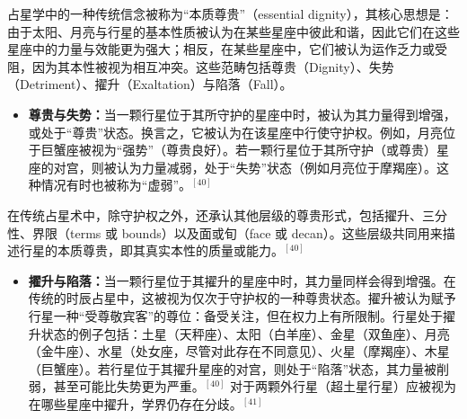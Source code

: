 占星学中的一种传统信念被称为“本质尊贵”（essential dignity），其核心思想是：由于太阳、月亮与行星的基本性质被认为在某些星座中彼此和谐，因此它们在这些星座中的力量与效能更为强大；相反，在某些星座中，它们被认为运作乏力或受阻，因为其本性被视为相互冲突。这些范畴包括尊贵（Dignity）、失势（Detriment）、擢升（Exaltation）与陷落（Fall）。
\begin{itemize}
\item \textbf{尊贵与失势：}当一颗行星位于其所守护的星座中时，被认为其力量得到增强，或处于“尊贵”状态。换言之，它被认为在该星座中行使守护权。例如，月亮位于巨蟹座被视为“强势”（尊贵良好）。若一颗行星位于其所守护（或尊贵）星座的对宫，则被认为力量减弱，处于“失势”状态（例如月亮位于摩羯座）。这种情况有时也被称为“虚弱”。$^{[40]}$  
\end{itemize}
在传统占星术中，除守护权之外，还承认其他层级的尊贵形式，包括擢升、三分性、界限（terms 或 bounds）以及面或旬（face 或 decan）。这些层级共同用来描述行星的本质尊贵，即其真实本性的质量或能力。$^{[40]}$
\begin{itemize}
\item \textbf{擢升与陷落：}当一颗行星位于其擢升的星座中时，其力量同样会得到增强。在传统的时辰占星中，这被视为仅次于守护权的一种尊贵状态。擢升被认为赋予行星一种“受尊敬宾客”的尊位：备受关注，但在权力上有所限制。行星处于擢升状态的例子包括：土星（天秤座）、太阳（白羊座）、金星（双鱼座）、月亮（金牛座）、水星（处女座，尽管对此存在不同意见）、火星（摩羯座）、木星（巨蟹座）。若行星位于其擢升星座的对宫，则处于“陷落”状态，其力量被削弱，甚至可能比失势更为严重。$^{[40]}$ 对于两颗外行星（超土星行星）应被视为在哪些星座中擢升，学界仍存在分歧。$^{[41]}$
\end{itemize}
